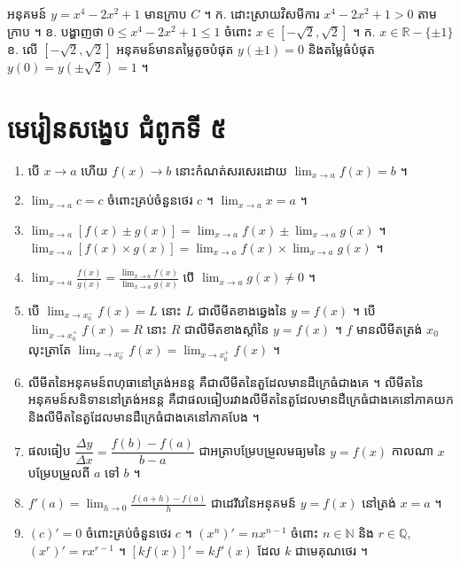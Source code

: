 \begin{pro}
អនុគមន៍ $y = x^4 - 2x^2 + 1$ មានក្រាប $C$ ។ \quad ក. ដោះស្រាយវិសមីការ $x^4 - 2x^2 + 1 > 0$ តាមក្រាប ។ \quad ខ. បង្ហាញថា $0 \le x^4 - 2x^2 + 1 \le 1$ ចំពោះ $x \in [-\sqrt{2}, \sqrt{2}]$ ។
\ans
ក. $x \in \mathbb{R} - \{\pm 1\}$ \quad ខ. លើ $[-\sqrt{2}, \sqrt{2}]$ អនុគមន៍មានតម្លៃតូចបំផុត $y(\pm 1) = 0$ និងតម្លៃធំបំផុត $y(0) = y(\pm\sqrt{2}) = 1$ ។
\end{pro}

\section*{មេរៀនសង្ខេប ជំពូកទី ៥}
\begin{note}[មេរៀនសង្ខេប]
\begin{enumerate}[1]
  \item បើ $x \to a$ ហើយ $f(x) \to b$ នោះកំណត់សរសេរដោយ $\displaystyle\lim_{x \to a} f(x) = b$ ។
  \item $\displaystyle\lim_{x \to a} c = c$ ចំពោះគ្រប់ចំនួនថេរ $c$ ។ \quad $\displaystyle\lim_{x \to a} x = a$ ។
  \item $\displaystyle\lim_{x \to a}[f(x) \pm g(x)] = \lim_{x \to a} f(x) \pm \lim_{x \to a} g(x)$ ។ \quad $\displaystyle\lim_{x \to a}[f(x)\times g(x)] = \lim_{x \to a} f(x)\times\lim_{x \to a} g(x)$ ។
  \item $\displaystyle\lim_{x \to a}\frac{f(x)}{g(x)} = \frac{\lim_{x \to a} f(x)}{\lim_{x \to a} g(x)}$ បើ $\displaystyle\lim_{x \to a} g(x) \ne 0$ ។
  \item បើ $\displaystyle\lim_{x \to x_0^-} f(x) = L$ នោះ $L$ ជាលីមីតខាងឆ្វេងនៃ $y = f(x)$ ។ បើ $\displaystyle\lim_{x \to x_0^+} f(x) = R$ នោះ $R$ ជាលីមីតខាងស្ដាំនៃ $y = f(x)$ ។ $f$ មានលីមីតត្រង់ $x_0$ លុះត្រាតែ $\displaystyle\lim_{x \to x_0^-} f(x) = \lim_{x \to x_0^+} f(x)$ ។
  \item លីមីតនៃអនុគមន៍ពហុធានៅត្រង់អនន្ត គឺជាលីមីតនៃតួដែលមានដឺក្រេធំជាងគេ ។ លីមីតនៃអនុគមន៍សនិទាននៅត្រង់អនន្ត គឺជាផលធៀបរវាងលីមីតនៃតួដែលមានដឺក្រេធំជាងគេនៅភាគយក និងលីមីតនៃតួដែលមានដឺក្រេធំជាងគេនៅភាគបែង ។
  \item ផលធៀប $\dfrac{\Delta y}{\Delta x} = \dfrac{f(b) - f(a)}{b - a}$ ជាអត្រាបម្រែបម្រួលមធ្យមនៃ $y = f(x)$ កាលណា $x$ បម្រែបម្រួលពី $a$ ទៅ $b$ ។
  \item $f'(a) = \displaystyle\lim_{h \to 0}\frac{f(a + h) - f(a)}{h}$ ជាដេរីវេនៃអនុគមន៍ $y = f(x)$ នៅត្រង់ $x = a$ ។
  \item $(c)' = 0$ ចំពោះគ្រប់ចំនួនថេរ $c$ ។ $(x^n)' = nx^{n-1}$ ចំពោះ $n \in \mathbb{N}$ និង $r \in \mathbb{Q}$, $(x^r)' = rx^{r-1}$ ។ $[kf(x)]' = kf'(x)$ ដែល $k$ ជាមេគុណថេរ ។

\end{enumerate}
\end{note}
